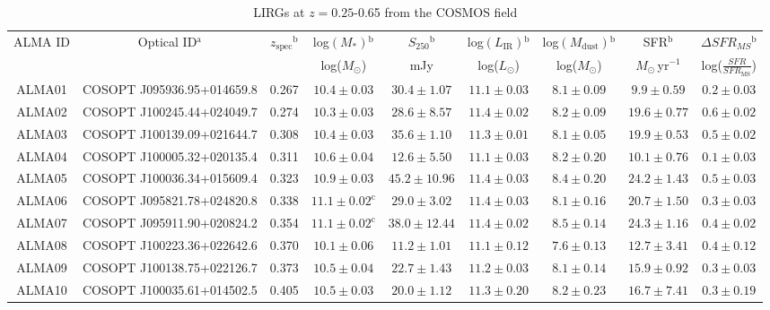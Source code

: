 \documentclass[a4paper,fleqn,usenatbib]{mnras}
\begin{document}
\begin{table*}
\centering
\caption{LIRGs at $z = 0.25$-0.65 from the COSMOS field}
\label{tab:targets}
\begin{tabular}{ccccccccc} %
\hline
\hline
ALMA ID & Optical ID$^{\mathrm{a}}$ & $z_{\mathrm{spec}}$$^{\mathrm{b}}$ & log$(M_\ast)$$^{\mathrm{b}}$ & $S_{\mathrm{250}}$$^{\mathrm{b}}$ &
log$(L_{\mathrm{IR}})$$^{\mathrm{b}}$ & log$(M_{\mathrm{dust}})$$^{\mathrm{b}}$ & SFR$^{\mathrm{b}}$ & $\Delta SFR_{MS}$$^{\mathrm{b}}$ \\
 &  &  & log($M_\odot$) & mJy & log($L_\odot$) & log($M_\odot$) & $M_\odot$\,yr$^{-1}$ & log($\frac{SFR}{SFR_{\mathrm{MS}}}$) \\
\hline
ALMA01 & COSOPT J095936.95+014659.8 & 0.267 & $10.4 \pm 0.03$ & $30.4 \pm 1.07$ & $11.1 \pm 0.03$ & $ 8.1 \pm 0.09$ & $ 9.9 \pm 0.59$ & $ 0.2 \pm 0.03$\\ 
ALMA02 & COSOPT J100245.44+024049.7 & 0.274 & $10.3 \pm 0.03$ & $28.6 \pm 8.57$ & $11.4 \pm 0.02$ & $ 8.2 \pm 0.09$ & $19.6 \pm 0.77$ & $ 0.6 \pm 0.02$\\ 
ALMA03 & COSOPT J100139.09+021644.7 & 0.308 & $10.4 \pm 0.03$ & $35.6 \pm 1.10$ & $11.3 \pm 0.01$ & $ 8.1 \pm 0.05$ & $19.9 \pm 0.53$ & $ 0.5 \pm 0.02$\\ 
ALMA04 & COSOPT J100005.32+020135.4 & 0.311 & $10.6 \pm 0.04$ & $12.6 \pm 5.50$ & $11.1 \pm 0.03$ & $ 8.2 \pm 0.20$ & $10.1 \pm 0.76$ & $ 0.1 \pm 0.03$\\ 
ALMA05 & COSOPT J100036.34+015609.4 & 0.323 & $10.9 \pm 0.03$ & $45.2 \pm 10.96$ & $11.4 \pm 0.03$ & $ 8.4 \pm 0.20$ & $24.2 \pm 1.43$ & $ 0.5 \pm 0.03$\\ 
ALMA06 & COSOPT J095821.78+024820.8 & 0.338 & $11.1 \pm 0.02^{\mathrm{c}}$ & $29.0 \pm 3.02$ & $11.4 \pm 0.03$ & $ 8.1 \pm 0.16$ & $20.7 \pm 1.50$ & $ 0.3 \pm 0.03$\\ 
ALMA07 & COSOPT J095911.90+020824.2 & 0.354 & $11.1 \pm 0.02^{\mathrm{c}}$ & $38.0 \pm 12.44$ & $11.4 \pm 0.02$ & $ 8.5 \pm 0.14$ & $24.3 \pm 1.16$ & $ 0.4 \pm 0.02$\\ 
ALMA08 & COSOPT J100223.36+022642.6 & 0.370 & $10.1 \pm 0.06$ & $11.2 \pm 1.01$ & $11.1 \pm 0.12$ & $ 7.6 \pm 0.13$ & $12.7 \pm 3.41$ & $ 0.4 \pm 0.12$\\ 
ALMA09 & COSOPT J100138.75+022126.7 & 0.373 & $10.5 \pm 0.04$ & $22.7 \pm 1.43$ & $11.2 \pm 0.03$ & $ 8.1 \pm 0.14$ & $15.9 \pm 0.92$ & $ 0.3 \pm 0.03$\\ 
ALMA10 & COSOPT J100035.61+014502.5 & 0.405 & $10.5 \pm 0.03$ & $20.0 \pm 1.12$ & $11.3 \pm 0.20$ & $ 8.2 \pm 0.23$ & $16.7 \pm 7.41$ & $ 0.3 \pm 0.19$\\ 

\end{tabular}
\end{table*}
\end{document}
